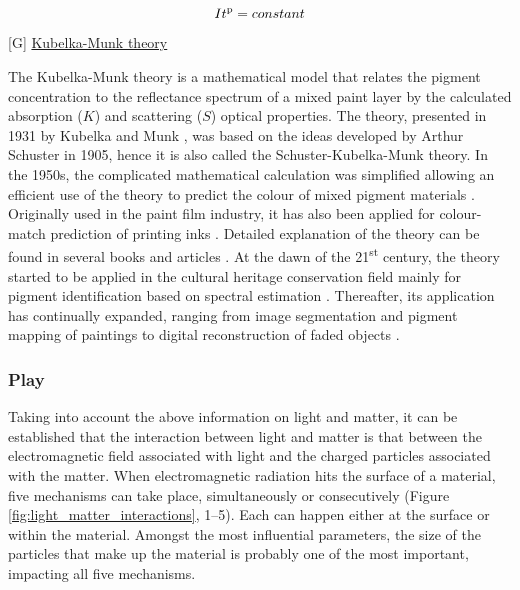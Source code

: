 \begin{equation}
    It\textsuperscript{p} = constant
\label{eq:reciprocity_schwarzschild}
\end{equation}


[G] \underline{Kubelka-Munk theory}

The Kubelka-Munk theory is a mathematical model that relates the pigment concentration to the reflectance spectrum of a mixed paint layer by the calculated absorption ($K$) and scattering ($S$) optical properties. The theory, presented in 1931 by Kubelka and Munk \citep{kubelka_beitrag_1931}, was based on the ideas developed by Arthur Schuster in 1905, hence it is also called the Schuster-Kubelka-Munk theory. In the 1950s, the complicated mathematical calculation was simplified \citep{atherton_relation_1955} allowing an efficient use of the theory to predict the colour of mixed pigment materials \citep{allen_fluorescent_1964, allen_basic_1974}. Originally used in the paint film industry, it has also been applied for colour-match prediction of printing inks \citep{hoffenberg_automated_1972, nobbs_colour-match_1997}. Detailed explanation of the theory can be found in several books and articles \citep{berns_billmeyer_2019, nobbs_kubelka-munk_1985, nobbs_colour-match_1997, zhao_image_2008}. At the dawn of the 21\textsuperscript{st} century, the theory started to be applied in the cultural heritage conservation field mainly for pigment identification based on spectral estimation \citep{berns_use_2002}. Thereafter, its application has continually expanded, ranging from image segmentation and pigment mapping of paintings \citep{zhao_image_2008, zhao_improvement_2005} to digital reconstruction of faded objects \citep{berns_rejuvenating_2006, geldof_reconstructing_2018, kirchner_digitally_2017}. \\


\subsubsection{Play}

Taking into account the above information on light and matter, it can be established that the interaction between light and matter is that between the electromagnetic field associated with light and the charged particles associated with the matter. When electromagnetic radiation hits the surface of a material, five mechanisms can take place, simultaneously or consecutively (Figure \ref{fig:light_matter_interactions}, 1–5). Each can happen either at the surface or within the material. Amongst the most influential parameters, the size of the particles that make up the material is probably one of the most important, impacting all five mechanisms.

